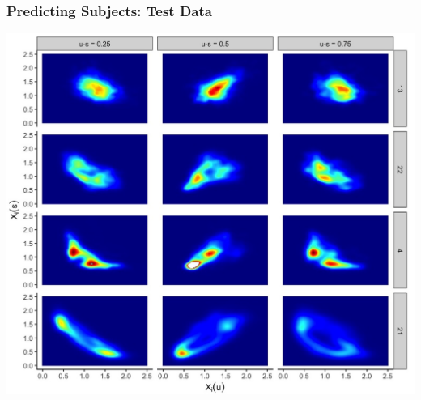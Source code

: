 \documentclass[10pt]{beamer}\usepackage[]{graphicx}\usepackage[]{color}
\begin{document}
\begin{frame}
\frametitle{Predicting Subjects: Test Data}
\centering
\includegraphics[height=\textheight]{kde_2d_fits_test.jpeg}
\end{frame}


% 
% 
\end{document}
